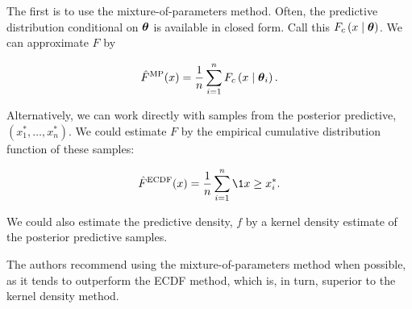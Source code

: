 The first is to use the mixture-of-parameters method.
Often, the predictive distribution conditional on \( \boldsymbol{\theta} \) is available in closed form.
Call this \( F_c \left( x \mid \boldsymbol{\theta} \right) \).
We can approximate \( F \) by 

\begin{equation}
    \hat{F}^\mathrm{MP}(x) = \frac{1}{n} \sum_{i=1}^n F_c \left( x \mid \boldsymbol{\theta}_i \right).
\end{equation}

Alternatively, we can work directly with samples from the posterior predictive, \( \left( x^*_1, \ldots, x^*_n \right) \).
We could estimate \( F \) by the empirical cumulative distribution function of these samples:

\begin{equation}
    \hat{F}^\mathrm{ECDF}(x) = \frac{1}{n} \sum_{i=1}^n \1{x \geq x^*_i}.
\end{equation}

We could also estimate the predictive density, \( f \) by a kernel density estimate of the posterior predictive samples.

The authors recommend using the mixture-of-parameters method when possible, as it tends to outperform the ECDF method, which is, in turn, superior to the kernel density method.

